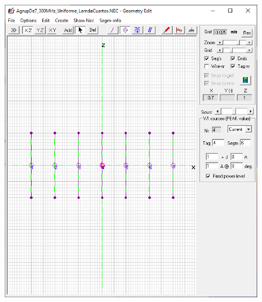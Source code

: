 \documentclass[11pt]{book}
\begin{document}
\begin{figure}[h]
{		\includegraphics[scale=0.35]{IMAGENES/a42}\label{a42}}	
	 \\

\end{figure}
\end{document}
